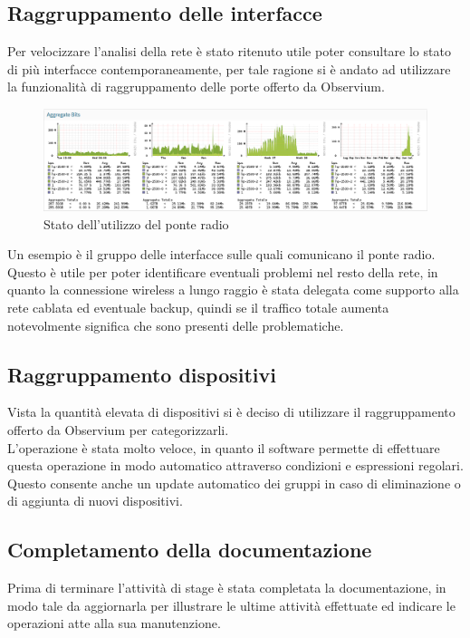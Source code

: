 \documentclass[Realizzazione.tex]{subfiles}
\begin{document}
\subsection{Raggruppamento delle interfacce}
Per velocizzare l'analisi della rete è stato ritenuto utile poter consultare lo stato di più interfacce contemporaneamente, per tale ragione si è andato ad utilizzare la funzionalità di raggruppamento delle porte offerto da Observium.

\begin{figure}[H]
	\centering
	\includegraphics[width=1\linewidth]{"images/trafficoponteradio"}
	\caption{Stato dell'utilizzo del ponte radio}
	\label{fig:Stato dell'utilizzo del ponte radio}
\end{figure}

Un esempio è il gruppo delle interfacce sulle quali comunicano il ponte radio. Questo è utile per poter identificare eventuali problemi nel resto della rete, in quanto la connessione wireless a lungo raggio è stata delegata come supporto alla rete cablata ed eventuale backup, quindi se il traffico totale aumenta notevolmente significa che sono presenti delle problematiche.


\subsection{Raggruppamento dispositivi}
Vista la quantità elevata di dispositivi si è deciso di utilizzare il raggruppamento offerto da Observium per categorizzarli. \\
L'operazione è stata molto veloce, in quanto il software permette di effettuare questa operazione in modo automatico attraverso condizioni e espressioni regolari. Questo consente anche un update automatico dei gruppi in caso di eliminazione o di aggiunta di nuovi dispositivi.

\subsection{Completamento della documentazione}
Prima di terminare l'attività di stage è stata completata la documentazione, in modo tale da aggiornarla per illustrare le ultime attività effettuate ed indicare le operazioni atte alla sua manutenzione.
\end{document}
